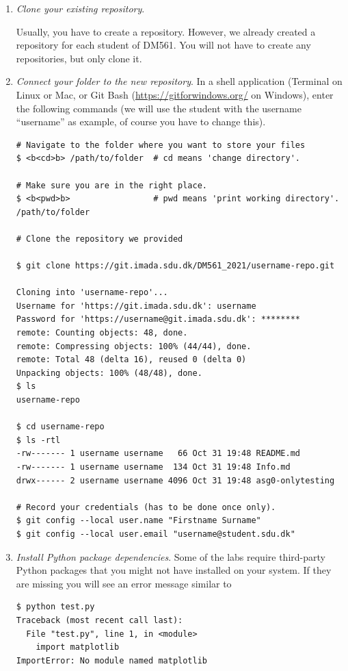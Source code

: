 \begin{enumerate}

\item \emph{Clone your existing repository}.

  Usually, you have to create a repository. However, we already created a repository for each student of DM561. You will not have to create any repositories, but only clone it.
  
\item \emph{Connect your folder to the new repository}.
\label{step:connect-folder}\label{step:download-data}
In a shell application (Terminal on Linux or Mac, or Git Bash (\url{https://gitforwindows.org/} on Windows), enter the following commands (we will use the student with the username ``username'' as example, of course you have to change this).

\begin{lstlisting}
# Navigate to the folder where you want to store your files
$ <b<cd>b> /path/to/folder  # cd means 'change directory'.

# Make sure you are in the right place.
$ <b<pwd>b>                 # pwd means 'print working directory'.
/path/to/folder

# Clone the repository we provided

$ git clone https://git.imada.sdu.dk/DM561_2021/username-repo.git

Cloning into 'username-repo'...
Username for 'https://git.imada.sdu.dk': username
Password for 'https://username@git.imada.sdu.dk': ********
remote: Counting objects: 48, done.
remote: Compressing objects: 100% (44/44), done.
remote: Total 48 (delta 16), reused 0 (delta 0)
Unpacking objects: 100% (48/48), done.
$ ls 
username-repo

$ cd username-repo
$ ls -rtl
-rw------- 1 username username   66 Oct 31 19:48 README.md
-rw------- 1 username username  134 Oct 31 19:48 Info.md
drwx------ 2 username username 4096 Oct 31 19:48 asg0-onlytesting

# Record your credentials (has to be done once only).
$ git config --local user.name "Firstname Surname"
$ git config --local user.email "username@student.sdu.dk"
\end{lstlisting}


\item \emph{Install Python package dependencies}.
\label{step:install-dependencies}
Some of the labs require third-party Python packages that you might not have installed on your system. If they are missing you will see an error message similar to 
\begin{lstlisting}
$ python test.py 
Traceback (most recent call last):
  File "test.py", line 1, in <module>
    import matplotlib
ImportError: No module named matplotlib
\end{lstlisting}


\end{enumerate}
